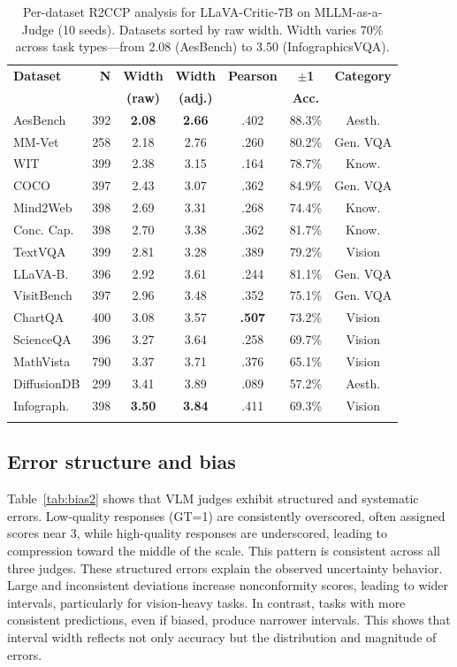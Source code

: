 \documentclass{article}
\begin{document}
\begin{table}[t]
\centering
\caption{Per-dataset R2CCP analysis for LLaVA-Critic-7B on MLLM-as-a-Judge (10 seeds). Datasets sorted by raw width. Width varies 70\% across task types---from 2.08 (AesBench) to 3.50 (InfographicsVQA).}
\label{tab:per_dataset}
\small
\begin{tabular}{lrccccc}
\toprule
\textbf{Dataset} & \textbf{N} & \textbf{Width} & \textbf{Width} & \textbf{Pearson} & $\pm$\textbf{1} & \textbf{Category} \\
& & \textbf{(raw)} & \textbf{(adj.)} & & \textbf{Acc.} & \\
\midrule
AesBench & 392 & \textbf{2.08} & \textbf{2.66} & .402 & 88.3\% & Aesth. \\
MM-Vet & 258 & 2.18 & 2.76 & .260 & 80.2\% & Gen. VQA \\
WIT & 399 & 2.38 & 3.15 & .164 & 78.7\% & Know. \\
COCO & 397 & 2.43 & 3.07 & .362 & 84.9\% & Gen. VQA \\
Mind2Web & 398 & 2.69 & 3.31 & .268 & 74.4\% & Know. \\
Conc. Cap. & 398 & 2.70 & 3.38 & .362 & 81.7\% & Know. \\
TextVQA & 399 & 2.81 & 3.28 & .389 & 79.2\% & Vision \\
LLaVA-B. & 396 & 2.92 & 3.61 & .244 & 81.1\% & Gen. VQA \\
VisitBench & 397 & 2.96 & 3.48 & .352 & 75.1\% & Gen. VQA \\
ChartQA & 400 & 3.08 & 3.57 & \textbf{.507} & 73.2\% & Vision \\
ScienceQA & 396 & 3.27 & 3.64 & .258 & 69.7\% & Vision \\
MathVista & 790 & 3.37 & 3.71 & .376 & 65.1\% & Vision \\
DiffusionDB & 299 & 3.41 & 3.89 & .089 & 57.2\% & Aesth. \\
Infograph. & 398 & \textbf{3.50} & \textbf{3.84} & .411 & 69.3\% & Vision \\
\bottomrule\vspace{-10pt}
\end{tabular}
\end{table}

\subsection{Error structure and bias}
\label{sec:error_bias}

Table~\ref{tab:bias2} shows that VLM judges exhibit structured and systematic errors. Low-quality responses (GT=1) are consistently overscored, often assigned scores near 3, while high-quality responses are underscored, leading to compression toward the middle of the scale. This pattern is consistent across all three judges. These structured errors explain the observed uncertainty behavior. Large and inconsistent deviations increase nonconformity scores, leading to wider intervals, particularly for vision-heavy tasks. In contrast, tasks with more consistent predictions, even if biased, produce narrower intervals. This shows that interval width reflects not only accuracy but the distribution and magnitude of errors.
\end{document}
